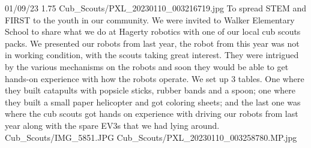{01/09/23}
{1.75}
{Cub_Scouts/PXL_20230110_003216719.jpg}
{To spread STEM and FIRST to the youth in our community.} 
{We were invited to Walker Elementary School to share what we do at Hagerty robotics with one of our local cub scouts packs. We presented our robots from last year, the robot from this year was not in working condition, with the scouts taking great interest. They were intrigued by the various mechanisms on the robots and soon they would be able to get hands-on experience with how the robots operate. We set up 3 tables. One where they built catapults with popsicle sticks, rubber bands and a spoon; one where they built a small paper helicopter and got coloring sheets; and the last one was where the cub scouts got hands on experience with driving our robots from last year along with the spare EV3s that we had lying around.  
} 
{Cub_Scouts/IMG_5851.JPG}
{Cub_Scouts/PXL_20230110_003258780.MP.jpg}
